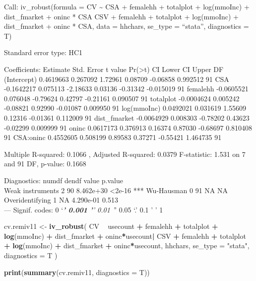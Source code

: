\documentclass[
]{article}
\newenvironment{Shaded}{\begin{snugshade}}{\end{snugshade}}
\newcommand{\DataTypeTok}[1]{\textcolor[rgb]{0.13,0.29,0.53}{#1}}
\newcommand{\KeywordTok}[1]{\textcolor[rgb]{0.13,0.29,0.53}{\textbf{#1}}}
\newcommand{\NormalTok}[1]{#1}
\newcommand{\OperatorTok}[1]{\textcolor[rgb]{0.81,0.36,0.00}{\textbf{#1}}}
\newcommand{\StringTok}[1]{\textcolor[rgb]{0.31,0.60,0.02}{#1}}
\begin{document}
Call: iv\_robust(formula = CV \textasciitilde{} CSA + femalehh +
totalplot + log(mmoInc) + dist\_fmarket + oninc * CSA \textbar{} CSV +
femalehh + totalplot + log(mmoInc) + dist\_fmarket + oninc * CSA, data =
hhchars, se\_type = ``stata'', diagnostics = T)

Standard error type: HC1

Coefficients: Estimate Std. Error t value
Pr(\textgreater\textbar t\textbar) CI Lower CI Upper DF (Intercept)
0.4619663 0.267092 1.72961 0.08709 -0.06858 0.992512 91 CSA -0.1642217
0.075113 -2.18633 0.03136 -0.31342 -0.015019 91 femalehh -0.0605521
0.076048 -0.79624 0.42797 -0.21161 0.090507 91 totalplot -0.0004624
0.005242 -0.08821 0.92990 -0.01087 0.009950 91 log(mmoInc) 0.0492021
0.031619 1.55609 0.12316 -0.01361 0.112009 91 dist\_fmarket -0.0064929
0.008303 -0.78202 0.43623 -0.02299 0.009999 91 oninc 0.0617173 0.376913
0.16374 0.87030 -0.68697 0.810408 91 CSA:oninc 0.4552605 0.508199
0.89583 0.37271 -0.55421 1.464735 91

Multiple R-squared: 0.1066 , Adjusted R-squared: 0.0379 F-statistic:
1.531 on 7 and 91 DF, p-value: 0.1668

Diagnostics: numdf dendf value p.value\\
Weak instruments 2 90 8.462e+30 \textless2e-16 *** Wu-Hausman 0 91 NA
NA\\
Overidentifying 1 NA 4.290e-01 0.513\\
--- Signif. codes: 0 `\emph{\textbf{' 0.001 '}' 0.01 '}' 0.05 `.' 0.1 '
' 1

\begin{Shaded}
\begin{Highlighting}[]
\NormalTok{cv.remiv11 <-}
\StringTok{  }\KeywordTok{iv_robust}\NormalTok{(}
\NormalTok{    CV }\OperatorTok{~}\StringTok{ }\NormalTok{usecount }\OperatorTok{+}\StringTok{ }\NormalTok{femalehh }\OperatorTok{+}\StringTok{ }\NormalTok{totalplot }\OperatorTok{+}\StringTok{ }\KeywordTok{log}\NormalTok{(mmoInc) }\OperatorTok{+}\StringTok{ }\NormalTok{dist_fmarket }\OperatorTok{+}\StringTok{ }\NormalTok{oninc}\OperatorTok{*}\NormalTok{usecount}\OperatorTok{|}
\StringTok{      }\NormalTok{CSV }\OperatorTok{+}\StringTok{ }\NormalTok{femalehh }\OperatorTok{+}\StringTok{ }\NormalTok{totalplot }\OperatorTok{+}\StringTok{ }\KeywordTok{log}\NormalTok{(mmoInc) }\OperatorTok{+}\StringTok{ }\NormalTok{dist_fmarket }\OperatorTok{+}\StringTok{ }\NormalTok{oninc}\OperatorTok{*}\NormalTok{usecount,}
\NormalTok{    hhchars,}
    \DataTypeTok{se_type =} \StringTok{"stata"}\NormalTok{,}
    \DataTypeTok{diagnostics =}\NormalTok{ T}
\NormalTok{  )}

\KeywordTok{print}\NormalTok{(}\KeywordTok{summary}\NormalTok{(cv.remiv11, }\DataTypeTok{diagnostics =}\NormalTok{ T))}
\end{Highlighting}
\end{Shaded}
\end{document}
